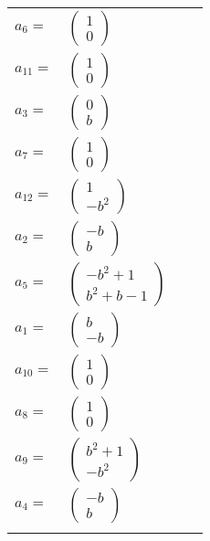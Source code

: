 \documentclass[1p]{elsarticle_modified}
\theoremstyle{definition}
\begin{document}
\begin{tabular}{m{7pt} m{180pt} m{7pt} m{180pt} }
\flushright $a_{6}=$&$\begin{pmatrix}1\\0\end{pmatrix}$ \\
\flushright $a_{11}=$&$\begin{pmatrix}1\\0\end{pmatrix}$ \\
\flushright $a_{3}=$&$\begin{pmatrix}0\\b\end{pmatrix}$ \\
\flushright $a_{7}=$&$\begin{pmatrix}1\\0\end{pmatrix}$ \\
\flushright $a_{12}=$&$\begin{pmatrix}1\\- b^2\end{pmatrix}$ \\
\flushright $a_{2}=$&$\begin{pmatrix}- b\\b\end{pmatrix}$ \\
\flushright $a_{5}=$&$\begin{pmatrix}- b^2+1\\b^2+b-1\end{pmatrix}$ \\
\flushright $a_{1}=$&$\begin{pmatrix}b\\- b\end{pmatrix}$ \\
\flushright $a_{10}=$&$\begin{pmatrix}1\\0\end{pmatrix}$ \\
\flushright $a_{8}=$&$\begin{pmatrix}1\\0\end{pmatrix}$ \\
\flushright $a_{9}=$&$\begin{pmatrix}b^2+1\\- b^2\end{pmatrix}$ \\
\flushright $a_{4}=$&$\begin{pmatrix}- b\\b\end{pmatrix}$\\&\end{tabular}
\end{document}
